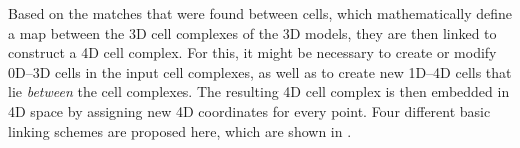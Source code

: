 Based on the matches that were found between cells, which mathematically define a map between the 3D cell complexes of the 3D models, they are then linked to construct a 4D cell complex.
For this, it might be necessary to create or modify 0D--3D cells in the input cell complexes, as well as to create new 1D--4D cells that lie \emph{between} the cell complexes.
The resulting 4D cell complex is then embedded in 4D space by assigning new 4D coordinates for every point.
Four different basic linking schemes are proposed here, which are shown in .
\begin{figure}[tb]
  \begin{center}
  \quad


\end{center}
\end{figure}

